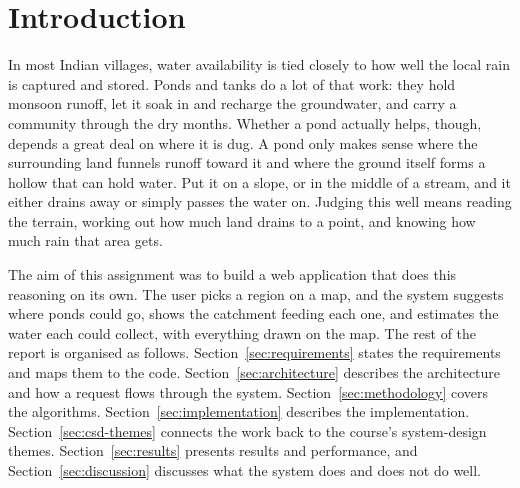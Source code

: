 \documentclass[manuscript,screen]{acmart}
\begin{document}
\maketitle
\thispagestyle{plain}
\pagestyle{plain}

\begin{center}
\end{center}
\vspace{4pt}

\section{Introduction}
\label{sec:intro}
In most Indian villages, water availability is tied closely to how well the local
rain is captured and stored. Ponds and tanks do a lot of that work: they hold
monsoon runoff, let it soak in and recharge the groundwater, and carry a community
through the dry months. Whether a pond actually helps, though, depends a great deal
on where it is dug. A pond only makes sense where the surrounding land funnels
runoff toward it and where the ground itself forms a hollow that can hold water. Put
it on a slope, or in the middle of a stream, and it either drains away or simply
passes the water on. Judging this well means reading the terrain, working out how
much land drains to a point, and knowing how much rain that area gets.

The aim of this assignment was to build a web application that does this reasoning
on its own. The user picks a region on a map, and the system suggests where ponds
could go, shows the catchment feeding each one, and estimates the water each could
collect, with everything drawn on the map. The rest of the report is organised as
follows. Section~\ref{sec:requirements} states the requirements and maps them to
the code. Section~\ref{sec:architecture} describes the architecture and how a
request flows through the system. Section~\ref{sec:methodology} covers the
algorithms. Section~\ref{sec:implementation} describes the implementation.
Section~\ref{sec:csd-themes} connects the work back to the course's system-design
themes. Section~\ref{sec:results} presents results and performance, and
Section~\ref{sec:discussion} discusses what the system does and does not do well.
\end{document}
